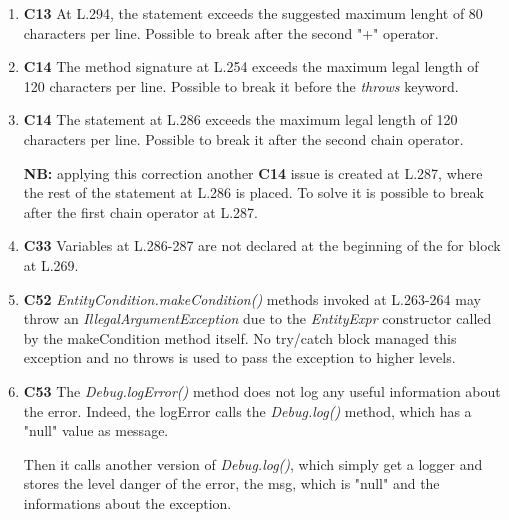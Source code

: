 \begin{enumerate}
	\item \textbf{C13} At L.294, the statement exceeds the suggested maximum lenght of 80 characters per line. Possible to break after the second "+" operator.

	\item \textbf{C14} The method signature at L.254 exceeds the maximum legal length of 120 characters per line. Possible to break it before the \textit{throws} keyword.

	\item \textbf{C14} The statement at L.286 exceeds the maximum legal length of 120 characters per line. Possible to break it after the second chain operator.

\textbf{NB:} applying this correction another \textbf{C14} issue is created at L.287, where the rest of the statement at L.286 is placed. To solve it is possible to break after the first chain operator at L.287.

	\item \textbf{C33} Variables at L.286-287 are not declared at the beginning of the for block at L.269.

	\item \textbf{C52} \textit{EntityCondition.makeCondition()} methods invoked at L.263-264 may throw an \textit{IllegalArgumentException} due to the \textit{EntityExpr} constructor called by the makeCondition method itself. No try/catch block managed this exception and no throws is used to pass the exception to higher levels.

	\item \textbf{C53} The \textit{Debug.logError()} method does not log any useful information about the error. 
Indeed, the logError calls the \textit{Debug.log()} method, which has a "null" value as message. 

Then it calls another version of \textit{Debug.log()}, which simply get a logger and stores the level danger of the error, the msg, which is "null" and the informations about the exception. 
\end{enumerate}
